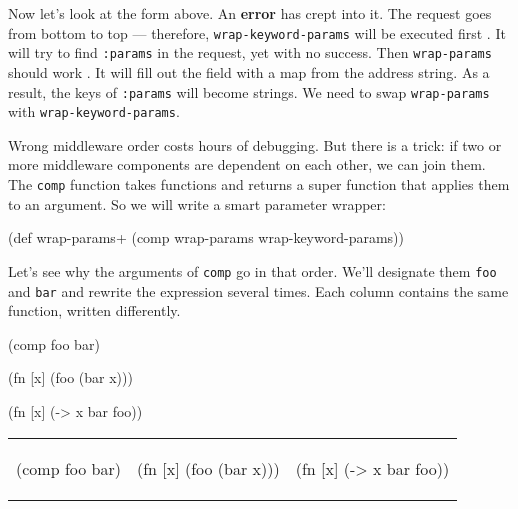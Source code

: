 
Now let's look at the  form above. An \textbf{error} has crept into it. The request goes from bottom to top — therefore, \verb|wrap-keyword-params| will be executed first . It will try to find \verb|:params| in the request, yet with no success. Then \verb|wrap-params| should work . It will fill out the field with a map from the address string. As a result, the keys of \verb|:params| will become strings. We need to swap \verb|wrap-params| with \verb|wrap-keyword-params|.

Wrong middleware order costs hours of debugging. But there is a trick: if two or more middleware components are dependent on each other, we can join them. The \verb|comp| function takes functions and returns a super function that applies them to an argument. So we will write a smart parameter wrapper:


\begin{english}
\begin{clojure}
(def wrap-params+ (comp wrap-params wrap-keyword-params))
\end{clojure}
\end{english}

Let's see why the arguments of \verb|comp| go in that order. We'll designate them \verb|foo| and \verb|bar| and rewrite the expression several times. Each column contains the same function, written differently.

\ifx\devicetype\mobile

\begin{english}
\begin{clojure}
(comp foo bar)

(fn [x]
(foo (bar x)))

(fn [x] (-> x
bar
foo))
\end{clojure}
\end{english}

\else

\begin{english}

\noindent
\begin{tabular}{ @{}p{3.2cm} @{}p{3.5cm} @{}p{3.5cm} }

\begin{clojure}
(comp foo bar)
\end{clojure}

&

\begin{clojure}
(fn [x]
(foo (bar x)))
\end{clojure}

&

\begin{clojure}
(fn [x] (-> x
bar
foo))
\end{clojure}

\end{tabular}

\end{english}

